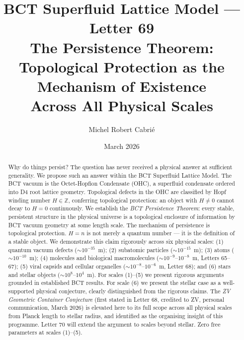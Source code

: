 \documentclass[aps,prl,preprint,superscriptaddress,floatfix]{revtex4-2}
\begin{document}
\title{BCT Superfluid Lattice Model --- Letter 69\\
The Persistence Theorem:\\
Topological Protection as the Mechanism of Existence\\
Across All Physical Scales}

\author{Michel Robert Cabri\'e}
\date{March 2026}

\begin{abstract}
Why do things persist? The question has never received a physical answer
at sufficient generality. We propose such an answer within the BCT
Superfluid Lattice Model. The BCT vacuum is the Octet-Hopfion Condensate
(OHC), a superfluid condensate ordered into D4 root lattice geometry.
Topological defects in the OHC are classified by Hopf winding number
$H \in \mathbb{Z}$, conferring topological protection: an object with
$H \neq 0$ cannot decay to $H = 0$ continuously. We establish the
\textit{BCT Persistence Theorem}: every stable, persistent structure in
the physical universe is a topological enclosure of information by BCT
vacuum geometry at some length scale. The mechanism of persistence is
topological protection. $H = n$ is not merely a quantum number --- it
is the definition of a stable object. We demonstrate this claim rigorously
across six physical scales: (1) quantum vacuum defects ($\sim 10^{-35}$~m);
(2) subatomic particles ($\sim 10^{-15}$~m); (3) atoms
($\sim 10^{-10}$~m); (4) molecules and biological macromolecules
($\sim 10^{-9}$--$10^{-8}$~m, Letters 65--67); (5) viral capsids and
cellular organelles ($\sim 10^{-8}$--$10^{-6}$~m, Letter 68); and
(6) stars and stellar objects ($\sim 10^{8}$--$10^{4}$~m).
For scales (1)--(5) we present rigorous arguments grounded in established
BCT results. For scale (6) we present the stellar case as a well-supported
physical conjecture, clearly distinguished from the rigorous claims.
The \textit{ZV Geometric Container Conjecture} (first stated in Letter 68,
credited to ZV, personal communication, March 2026) is elevated here
to its full scope across all physical scales from Planck length to
stellar radius, and identified as the organising insight of this
programme. Letter 70 will extend the argument to scales beyond stellar.
Zero free parameters at scales (1)--(5).
\end{abstract}

\maketitle
\end{document}

